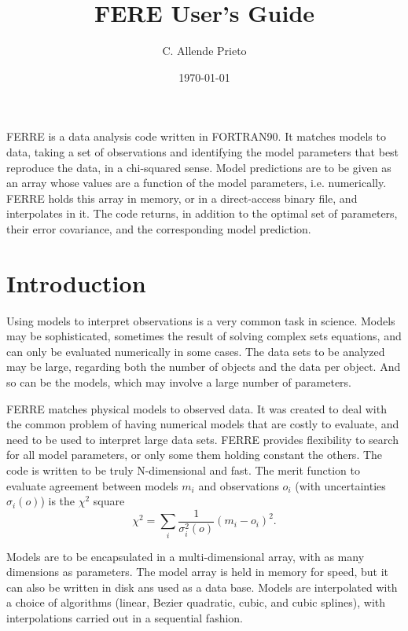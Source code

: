 \documentclass[12pt]{article}
\begin{document}
\title{FERE User's Guide}

\date{\today}
\author{C. Allende Prieto}

\maketitle

FERRE is a data analysis code written in FORTRAN90. 
It matches models to data, taking a set of observations 
and identifying the model parameters that best
reproduce the data, in a chi-squared sense. 
Model predictions are to be given as an array whose values are a function of 
the model parameters, i.e. numerically. 
FERRE holds this array in memory, or in a direct-access binary file,
and interpolates in it. The code returns, in addition to the optimal 
set of parameters, their error covariance, and the corresponding model prediction. 

\tableofcontents

\newpage

\section{Introduction}
\label{intro}

Using models to interpret observations is a very common task in 
science. Models may be sophisticated, sometimes the result 
of solving complex sets equations, and can only be evaluated numerically 
in some cases. The data sets to be analyzed may be large, regarding both 
the number of objects and the data per object. And so can be the models, 
which may involve a large number of parameters. 

FERRE matches physical models to observed data. It was created to 
deal with the common problem of having numerical models that are
costly to evaluate, and need to be used to interpret large data sets.
FERRE provides flexibility to search for all model parameters, or 
only some them holding constant the others. The code is written
to be truly N-dimensional and fast. The merit function to evaluate 
agreement between models ${m_i}$ and observations ${o_i}$ 
(with uncertainties ${\sigma_i(o)}$) is the $\chi^2$ square
\begin{equation}
\chi^2 = \sum_i \frac{1}{\sigma_i^2(o)} (m_i - o_i)^2.
\end{equation}

Models are to be
encapsulated in a multi-dimensional array, with as many dimensions
as parameters. The model array is held in memory for speed, but it can
also be written in disk ans used as a data base. Models are interpolated with a choice
of algorithms (linear, Bezier quadratic, cubic, and cubic splines), with 
interpolations carried out in a sequential fashion. 
\end{document}
